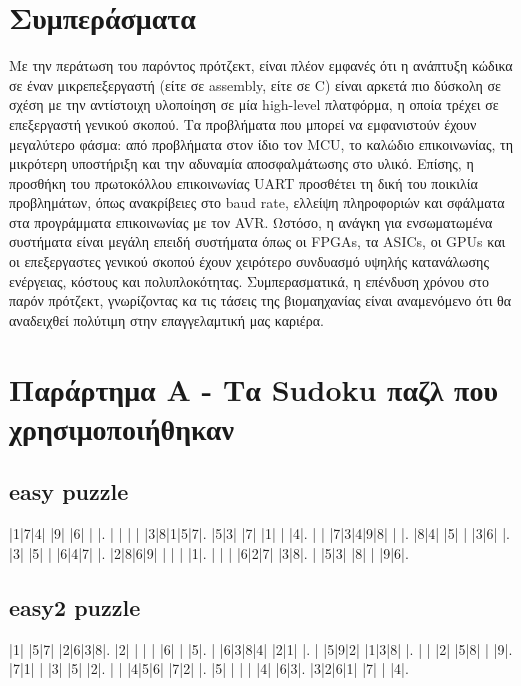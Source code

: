 \documentclass[a4paper,12pt]{article}
\begin{document}
\section{Συμπεράσματα}
Με την περάτωση του παρόντος πρότζεκτ, είναι πλέον εμφανές ότι η ανάπτυξη κώδικα σε έναν μικρεπεξεργαστή (είτε σε assembly, είτε σε C) είναι αρκετά πιο δύσκολη σε σχέση με την αντίστοιχη υλοποίηση σε μία high-level πλατφόρμα, η οποία τρέχει σε επεξεργαστή γενικού σκοπού. Τα προβλήματα που μπορεί να εμφανιστούν έχουν μεγαλύτερο φάσμα: από προβλήματα στον ίδιο τον MCU, το καλώδιο επικοινωνίας, τη μικρότερη υποστήριξη και την αδυναμία αποσφαλμάτωσης στο υλικό. Επίσης, η προσθήκη του πρωτοκόλλου επικοινωνίας UART προσθέτει τη δική του ποικιλία προβλημάτων, όπως ανακρίβειες στο baud rate, ελλείψη πληροφοριών και σφάλματα στα προγράμματα επικοινωνίας με τον AVR. Ωστόσο, η ανάγκη για ενσωματωμένα συστήματα είναι μεγάλη επειδή συστήματα όπως οι FPGAs, τα ASICs, οι GPUs και οι επεξεργαστες γενικού σκοπού έχουν χειρότερο συνδυασμό υψηλής κατανάλωσης ενέργειας, κόστους και πολυπλοκότητας. Συμπερασματικά, η επένδυση χρόνου στο παρόν πρότζεκτ, γνωρίζοντας κα τις τάσεις της βιομαηχανίας είναι αναμενόμενο ότι θα αναδειχθεί πολύτιμη στην επαγγελαμτική μας καριέρα.\\



\section{Παράρτημα A - Τα Sudoku παζλ που χρησιμοποιήθηκαν} \label{section:sudokus}

\subsection{easy puzzle}

\setlength\sudokusize{7cm}

\begin{sudoku}
|1|7|4| |9| |6| | |.
| | | | |3|8|1|5|7|.
|5|3| |7| |1| | |4|.
| | |7|3|4|9|8| | |.
|8|4| |5| | |3|6| |.
|3| |5| | |6|4|7| |.
|2|8|6|9| | | | |1|.
| | | |6|2|7| |3|8|.
| |5|3| |8| | |9|6|.
\end{sudoku}


\subsection{easy2 puzzle}

\begin{sudoku}
|1| |5|7| |2|6|3|8|.
|2| | | | |6| | |5|.
| |6|3|8|4| |2|1| |.
| |5|9|2| |1|3|8| |.
| | |2| |5|8| | |9|.
|7|1| | |3| |5| |2|.
| | |4|5|6| |7|2| |.
|5| | | | |4| |6|3|.
|3|2|6|1| |7| | |4|.
\end{sudoku}
\end{document}
